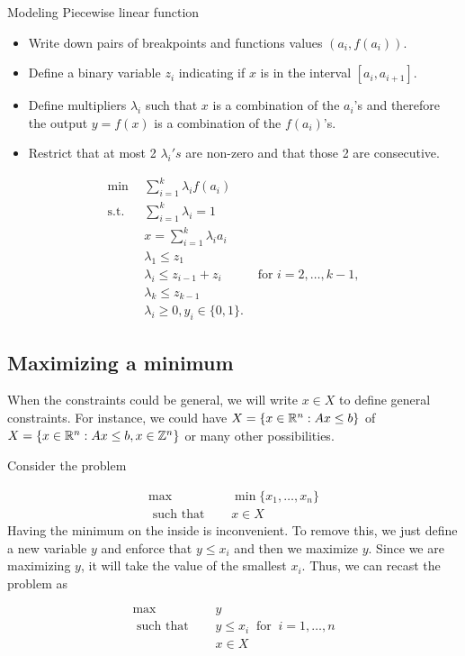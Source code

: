 {Modeling Piecewise linear function}
{\begin{itemize}
\item Write down pairs of breakpoints and functions values $(a_i, f(a_i))$.
\item Define a binary variable $z_i$ indicating if $x$ is in the interval $[a_i, a_{i+1}]$.
\item Define multipliers $\lambda_i$ such that $x$ is a combination of the $a_i$'s and therefore the output $y = f(x)$ is a combination of the $f(a_i)$'s.
\item Restrict that at most 2 $\lambda_i's$ are non-zero and that those 2 are consecutive.

\end{itemize}

\begin{align*}
\min \ \ & \sum_{i=1}^k \lambda_i f(a_i)\\
\text{s.t.} \ \ &  \sum_{i=1}^k \lambda_i = 1\\
& x = \sum_{i=1}^k \lambda_i a_i\\
& \lambda_1 \leq z_1\\
& \lambda_i \leq z_{i-1} + z_{i} & \text{ for }  i=2, \dots, k-1,\\
& \lambda_k \leq z_{k-1}\\
& \lambda_i \geq 0, y_i \in \{0,1\}.
\end{align*}

\subsection{Maximizing a minimum}
When the constraints could be general, we will write $x \in X$ to define general constraints.  For instance, we could have $X = \{ x \in {\mathbb{R}}^n : Ax \leq b\}$ of $X  = \{ x \in {\mathbb{R}}^n : Ax \leq b, x \in {\mathbb{Z}}^n\}$ or many other possibilities.  


Consider the problem 

\begin{align*}
\max   \quad & \min \{x_1, \dots, x_n\}\\
\text{ such that } \quad &  x \in X
\end{align*}
Having the minimum on the inside is inconvenient.  To remove this, we just define a new variable $y$ and enforce that $y \leq x_i$ and then we maximize $y$.  Since we are maximizing $y$, it will take the value of the smallest $x_i$.  Thus, we can recast the problem as

\begin{align*}
\max\quad    & y\\
\text{ such that } \quad  & y \leq x_i \ \text{ for }\  i=1, \dots, n \\
&  x \in X
\end{align*}


}
